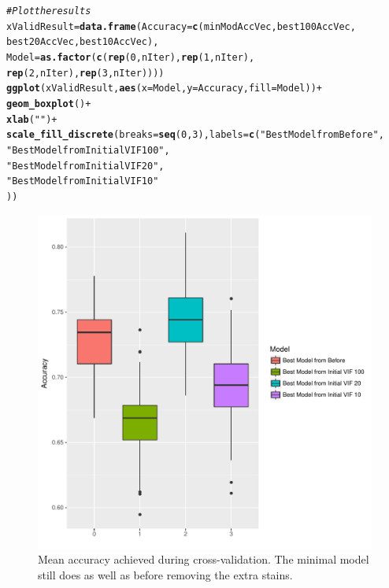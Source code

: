 \documentclass[a4paper]{article}\usepackage[]{graphicx}\usepackage[]{color}
\makeatletter
\def\maxwidth{ %
  \ifdim\Gin@nat@width>\linewidth
    \linewidth
  \else
    \Gin@nat@width
  \fi
}
\newcommand{\hlnum}[1]{\textcolor[rgb]{0.686,0.059,0.569}{#1}}%
\newcommand{\hlstr}[1]{\textcolor[rgb]{0.192,0.494,0.8}{#1}}%
\newcommand{\hlcom}[1]{\textcolor[rgb]{0.678,0.584,0.686}{\textit{#1}}}%
\newcommand{\hlopt}[1]{\textcolor[rgb]{0,0,0}{#1}}%
\newcommand{\hlstd}[1]{\textcolor[rgb]{0.345,0.345,0.345}{#1}}%
\newcommand{\hlkwb}[1]{\textcolor[rgb]{0.69,0.353,0.396}{#1}}%
\newcommand{\hlkwc}[1]{\textcolor[rgb]{0.333,0.667,0.333}{#1}}%
\newcommand{\hlkwd}[1]{\textcolor[rgb]{0.737,0.353,0.396}{\textbf{#1}}}%
\newenvironment{kframe}{%
 \def\at@end@of@kframe{}%
 \ifinner\ifhmode%
  \def\at@end@of@kframe{\end{minipage}}%
  \begin{minipage}{\columnwidth}%
 \fi\fi%
 \def\FrameCommand##1{\hskip\@totalleftmargin \hskip-\fboxsep
 \colorbox{shadecolor}{##1}\hskip-\fboxsep
     \hskip-\linewidth \hskip-\@totalleftmargin \hskip\columnwidth}%
 \MakeFramed {\advance\hsize-\width
   \@totalleftmargin\z@ \linewidth\hsize
   \@setminipage}}%
 {\par\unskip\endMakeFramed%
 \at@end@of@kframe}
\newenvironment{knitrout}{}{} %
\makeatother
\begin{document}
\begin{knitrout}
\begin{kframe}
\begin{alltt}
\hlcom{# Plot the results}
\hlstd{xValidResult} \hlkwb{=} \hlkwd{data.frame}\hlstd{(}\hlkwc{Accuracy}\hlstd{=}\hlkwd{c}\hlstd{(minModAccVec,best100AccVec,}
                                     \hlstd{best20AccVec,best10AccVec),}
                          \hlkwc{Model}\hlstd{=}\hlkwd{as.factor}\hlstd{(}\hlkwd{c}\hlstd{(}\hlkwd{rep}\hlstd{(}\hlnum{0}\hlstd{,nIter),}\hlkwd{rep}\hlstd{(}\hlnum{1}\hlstd{,nIter),}
                                            \hlkwd{rep}\hlstd{(}\hlnum{2}\hlstd{,nIter),}\hlkwd{rep}\hlstd{(}\hlnum{3}\hlstd{,nIter))))}
\hlkwd{ggplot}\hlstd{(xValidResult,}\hlkwd{aes}\hlstd{(}\hlkwc{x}\hlstd{=Model,}\hlkwc{y}\hlstd{=Accuracy,}\hlkwc{fill}\hlstd{=Model))} \hlopt{+}
  \hlkwd{geom_boxplot}\hlstd{()} \hlopt{+}
  \hlkwd{xlab}\hlstd{(}\hlstr{""}\hlstd{)} \hlopt{+}
  \hlkwd{scale_fill_discrete}\hlstd{(}\hlkwc{breaks}\hlstd{=}\hlkwd{seq}\hlstd{(}\hlnum{0}\hlstd{,}\hlnum{3}\hlstd{),}\hlkwc{labels}\hlstd{=}\hlkwd{c}\hlstd{(}\hlstr{"Best Model from Before"}\hlstd{,}
                                               \hlstr{"Best Model from Initial VIF 100"}\hlstd{,}
                                               \hlstr{"Best Model from Initial VIF 20"}\hlstd{,}
                                               \hlstr{"Best Model from Initial VIF 10"}
                                               \hlstd{))}
\end{alltt}
\end{kframe}\begin{figure}[h]
\includegraphics[width=\maxwidth]{figure/FigModelCrossVal3-1} \caption[Mean accuracy achieved during cross-validation]{Mean accuracy achieved during cross-validation. The minimal model still does as well as before removing the extra stains.}\label{fig:FigModelCrossVal3}
\end{figure}


\end{knitrout}
\end{document}
